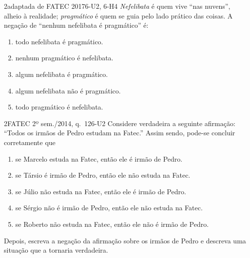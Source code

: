 \begin{questao}{2}{adaptada de FATEC 2017}{6-U2, 6-H4}\label{u6:q6}
\emph{Nefelibata} é quem vive \enquote{nas nuvens}, alheio à realidade; \emph{pragmático} é quem se guia pelo lado prático das coisas. A negação de \enquote{nenhum nefelibata é pragmático} é:
\begin{enumerate}[label=(\alph*)]
  \item todo nefelibata é pragmático.
  \item nenhum pragmático é nefelibata.
  \item algum nefelibata é pragmático.
  \item algum nefelibata não é pragmático.
  \item todo pragmático é nefelibata.
\end{enumerate}
\end{questao}

\begin{questao}{2}{FATEC 2º sem./2014, q.~12}{6-U2}\label{u6:q7}
Considere verdadeira a seguinte afirmação: \enquote{Todos os irmãos de Pedro estudam na Fatec.} Assim sendo, pode-se concluir corretamente que
\begin{enumerate}[label=(\alph*)]
  \item se Marcelo estuda na Fatec, então ele é irmão de Pedro.
  \item se Társio é irmão de Pedro, então ele não estuda na Fatec.
  \item se Júlio não estuda na Fatec, então ele é irmão de Pedro.
  \item se Sérgio não é irmão de Pedro, então ele não estuda na Fatec.
  \item se Roberto não estuda na Fatec, então ele não é irmão de Pedro.
\end{enumerate}
Depois, escreva a negação da afirmação sobre os irmãos de Pedro e descreva uma situação que a tornaria verdadeira.
\end{questao}


